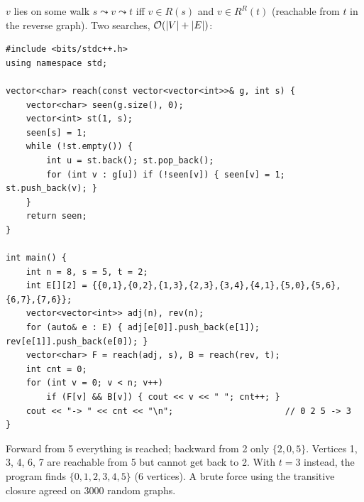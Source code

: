\begin{solutionbox}
$v$ lies on some walk $s \leadsto v \leadsto t$ iff $v \in R(s)$ and $v \in R^{R}(t)$ (reachable from $t$ in the reverse graph). Two searches, $\mathcal{O}(|V|+|E|)$:
\begin{lstlisting}[style=cpp]
#include <bits/stdc++.h>
using namespace std;

vector<char> reach(const vector<vector<int>>& g, int s) {
    vector<char> seen(g.size(), 0);
    vector<int> st(1, s);
    seen[s] = 1;
    while (!st.empty()) {
        int u = st.back(); st.pop_back();
        for (int v : g[u]) if (!seen[v]) { seen[v] = 1; st.push_back(v); }
    }
    return seen;
}

int main() {
    int n = 8, s = 5, t = 2;
    int E[][2] = {{0,1},{0,2},{1,3},{2,3},{3,4},{4,1},{5,0},{5,6},{6,7},{7,6}};
    vector<vector<int>> adj(n), rev(n);
    for (auto& e : E) { adj[e[0]].push_back(e[1]); rev[e[1]].push_back(e[0]); }
    vector<char> F = reach(adj, s), B = reach(rev, t);
    int cnt = 0;
    for (int v = 0; v < n; v++)
        if (F[v] && B[v]) { cout << v << " "; cnt++; }
    cout << "-> " << cnt << "\n";                      // 0 2 5 -> 3
}
\end{lstlisting}
Forward from 5 everything is reached; backward from 2 only $\{2, 0, 5\}$. Vertices 1, 3, 4, 6, 7 are reachable from 5 but cannot get back to 2. With $t = 3$ instead, the program finds $\{0,1,2,3,4,5\}$ (6 vertices). A brute force using the transitive closure agreed on 3000 random graphs.
\end{solutionbox}

